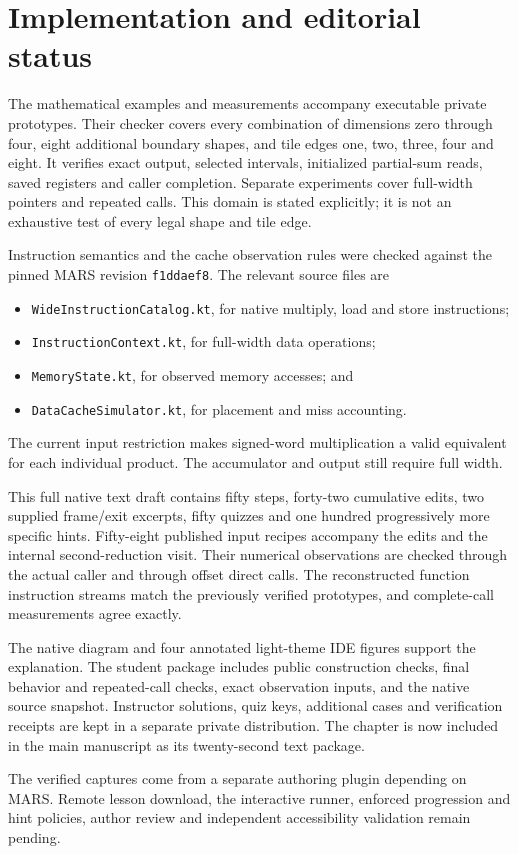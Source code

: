 \section*{Implementation and editorial status}
The mathematical examples and measurements accompany executable private prototypes.
Their checker covers every combination of dimensions zero through four, eight additional
boundary shapes, and tile edges one, two, three, four and eight. It verifies exact
output, selected intervals, initialized partial-sum reads, saved registers and caller
completion. Separate experiments cover full-width pointers and repeated calls.
This domain is stated explicitly; it is not an exhaustive test of every legal
shape and tile edge.

Instruction semantics and the cache observation rules were checked against the pinned
MARS revision \texttt{f1ddaef8}. The relevant source files are
\begin{itemize}
  \item \texttt{WideInstructionCatalog.kt}, for native multiply, load and store instructions;
  \item \texttt{InstructionContext.kt}, for full-width data operations;
  \item \texttt{MemoryState.kt}, for observed memory accesses; and
  \item \texttt{DataCacheSimulator.kt}, for placement and miss accounting.
\end{itemize}
The current input restriction makes signed-word
multiplication a valid equivalent for each individual product. The accumulator and
output still require full width.

This full native text draft contains fifty steps, forty-two cumulative edits,
two supplied frame/exit excerpts, fifty quizzes and one hundred progressively
more specific hints. Fifty-eight published input recipes accompany the edits
and the internal second-reduction visit. Their numerical observations are checked
through the actual caller and through offset direct calls. The reconstructed
function instruction streams match the previously verified prototypes, and
complete-call measurements agree exactly.

The native diagram and four annotated light-theme IDE figures support the explanation.
The student package includes public construction checks, final behavior and repeated-call
checks, exact observation inputs, and the native source snapshot. Instructor solutions,
quiz keys, additional cases and verification receipts are kept in a separate private
distribution. The chapter is now included in the main manuscript as its twenty-second
text package.

The verified captures come from a separate authoring plugin depending on MARS. Remote
lesson download, the interactive runner, enforced progression and hint policies, author
review and independent accessibility validation remain pending.
